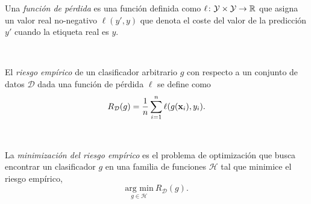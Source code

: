 \documentclass[oneside,openright,titlepage,numbers=noenddot,openany,headinclude,footinclude=true,
cleardoublepage=empty,abstractoff,BCOR=5mm,paper=a4,fontsize=12pt,main=spanish]{scrreprt}
\begin{document}
\begin{definition}
Una \textit{función de pérdida} es una función definida como $\ell \colon \mathcal{Y} \times \mathcal{Y} \to \mathbb{R}$ que asigna un valor real no-negativo $\ell(y',y)$ que denota el coste del valor de la predicción $y'$ cuando la etiqueta real es $y$.
\end{definition}\

\begin{definition}
El \textit{riesgo empírico} de un clasificador arbitrario $g$ con respecto a un conjunto de datos $\mathcal{D}$ dada una función de pérdida $\ell$ se define como $$R_{\mathcal{D}}(g)=\frac{1}{n}\sum_{i=1}^n \ell(g(\textbf{x}_i),y_i).$$
\end{definition}\

\begin{definition} \label{def:minrisk}
La \textit{minimización del riesgo empírico} es el problema de optimización que busca encontrar un clasificador $g$ en una familia de funciones $\mathcal{H}$ tal que minimice el riesgo empírico, $$\underset{g\in \mathcal{H}}{\text{arg min}} \  R_{\mathcal{D}}(g).$$
\end{definition}\
\end{document}
